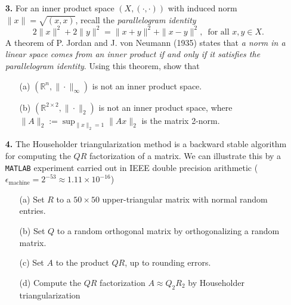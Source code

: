 \documentclass[10pt]{report}
\begin{document}
\begin{enumerate}
\pagebreak

\item[\textbf{3.}] For an inner product space $(X, (\cdot, \cdot))$ with induced norm $\|x\|= \sqrt{(x, x)}$, recall  the \textit{parallelogram identity}
\[2 \|x\|^2 + 2\|y\|^2 = \|x+y\|^2 + \|x-y\|^2, \, \text{ for all } x,y \in X.\]
A theorem of P. Jordan and J. von Neumann (1935) states that \textit{a norm in a linear space comes from an inner product if and only if it satisfies the parallelogram identity}. Using this theorem, show that

\begin{enumerate}
  \item[(a)] $(\mathbb{R}^n, \| \cdot \|_\infty)$ is not an inner product space.
  \item[(b)] $(\mathbb{R}^{2 \times 2}, \| \cdot \|_2)$ is not an inner product space, where $\|A\|_2:= \sup_{\|x\|_2=1} \|Ax\|_2$ is the matrix 2-norm.

\end{enumerate}


\vspace{0.7cm}











\item[\textbf{4.}] The Householder triangularization method is a backward stable algorithm
  for computing the $QR$ factorization of a matrix. We can illustrate this by a \verb+MATLAB+
  experiment carried out in IEEE double precision arithmetic
  ($\epsilon_{\text{machine}}=2^{-53}\approx 1.11\times10^{-16}$)

  \begin{enumerate}
    \item[(a)] Set $R$ to a $50\times50$ upper-triangular matrix with normal
    random entries.
    \item[(b)] Set $Q$ to a random orthogonal matrix by orthogonalizing a random
    matrix.
    \item[(c)] Set $A$ to the product $QR$, up to rounding errors.
    \item[(d)] Compute the $QR$ factorization $A\approx Q_2R_2$ by Householder
    triangularization 
  \end{enumerate}


\end{enumerate}
\end{document}
